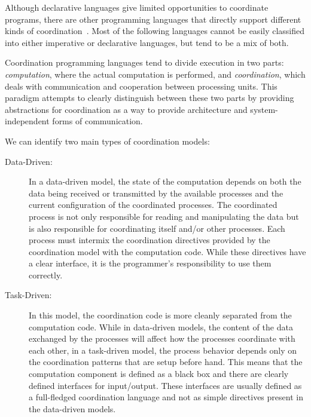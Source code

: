Although declarative languages give limited opportunities to coordinate
programs, there are other programming languages that directly support different
kinds of coordination~\cite{Papadopoulos98coordinationmodels}. Most of the
following languages cannot be easily classified into either imperative or
declarative languages, but tend to be a mix of both.

Coordination programming languages tend to divide execution in two parts:
\emph{computation}, where the actual computation is performed, and
\emph{coordination}, which deals with communication and cooperation between
processing units. This paradigm attempts to clearly distinguish between these
two parts by providing abstractions for coordination as a way to provide
architecture and system-independent forms of communication.

We can identify two main types of coordination models:

\begin{description}
   \item[Data-Driven:]
   
   In a data-driven model, the state of the computation depends on both the data
   being received or transmitted by the available processes and the current configuration
   of the coordinated processes. The coordinated process is not only responsible
   for reading and manipulating the data but is also responsible for
   coordinating itself and/or other processes. Each process must intermix the
   coordination directives provided by the coordination model with the
   computation code. While these directives have a clear interface, it is
   the programmer's responsibility to use them correctly.

   \item[Task-Driven:]
   
   In this model, the coordination code is more cleanly separated from the
   computation code. While in data-driven models, the content of the data
   exchanged by the processes will affect how the processes coordinate with each
   other, in a task-driven model, the process behavior depends only on the
   coordination patterns that are setup before hand. This means that the
   computation component is defined as a black box and there are clearly defined
   interfaces for input/output. These interfaces are usually defined as a
   full-fledged coordination language and not as simple directives present in
   the data-driven models.  \end{description}

